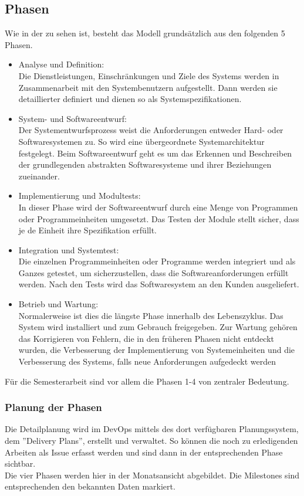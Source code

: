 \subsection{Phasen}
Wie in der  zu sehen ist, besteht das Modell grundsätzlich aus den folgenden 5 Phasen.
  \begin{itemize}
      \item Analyse und Definition:\\
      Die Dienstleistungen, Einschränkungen und Ziele des Systems werden in Zusammenarbeit mit den Systembenutzern aufgestellt. Dann werden sie detaillierter  definiert und dienen so als Systemspezifikationen. 
      \item System- und Softwareentwurf:\\  Der Systementwurfsprozess weist die Anforderungen entweder Hard- oder Softwaresystemen zu. So wird eine übergeordnete Systemarchitektur festgelegt. Beim Softwareentwurf geht es um das Erkennen und Beschreiben der grundlegenden abstrakten Softwaresysteme und ihrer Beziehungen zueinander. 
      \item Implementierung und Modultests:\\  In dieser Phase wird der Softwareentwurf durch eine Menge von Programmen oder Programmeinheiten umgesetzt. Das Testen der Module stellt sicher, dass je de Einheit ihre Spezifikation erfüllt.
      \item Integration und Systemtest:\\  Die einzelnen Programmeinheiten oder Programme werden integriert und als Ganzes getestet, um sicherzustellen, dass die Softwareanforderungen erfüllt werden. Nach den Tests wird das Softwaresystem an den Kunden ausgeliefert.
      \item Betrieb und Wartung:\\ Normalerweise ist dies die längste Phase innerhalb des Lebenszyklus. Das System wird installiert und zum Gebrauch freigegeben. Zur Wartung gehören das Korrigieren von Fehlern,  die in den früheren Phasen nicht entdeckt wurden, die Verbesserung der Implementierung von Systemeinheiten und die Verbesserung des Systems, falls neue Anforderungen aufgedeckt werden
  \end{itemize}

Für die Semesterarbeit sind vor allem die Phasen 1-4 von zentraler Bedeutung.
\newpage
\subsubsection{Planung der Phasen}
Die Detailplanung wird im DevOps mittels des dort verfügbaren Planungssystem, dem ''Delivery Plans'', erstellt und verwaltet. So können die noch zu erledigenden Arbeiten als Issue erfasst werden und sind dann in der entsprechenden Phase sichtbar.\\
Die vier Phasen werden hier in der Monatsansicht abgebildet. Die Milestones sind entsprechenden den bekannten Daten markiert.

